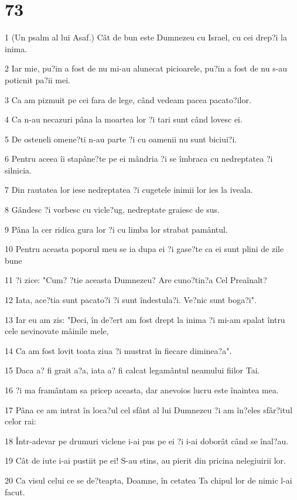 \chapter{73}

\par 1 (Un psalm al lui Asaf.) Cât de bun este Dumnezeu cu Israel, cu cei drep?i la inima.
\par 2 Iar mie, pu?in a fost de nu mi-au alunecat picioarele, pu?in a fost de nu s-au poticnit pa?ii mei.
\par 3 Ca am pizmuit pe cei fara de lege, când vedeam pacea pacato?ilor.
\par 4 Ca n-au necazuri pâna la moartea lor ?i tari sunt când lovesc ei.
\par 5 De osteneli omene?ti n-au parte ?i cu oamenii nu sunt biciui?i.
\par 6 Pentru aceea îi stapâne?te pe ei mândria ?i se îmbraca cu nedreptatea ?i silnicia.
\par 7 Din rautatea lor iese nedreptatea ?i cugetele inimii lor ies la iveala.
\par 8 Gândesc ?i vorbesc cu vicle?ug, nedreptate graiesc de sus.
\par 9 Pâna la cer ridica gura lor ?i cu limba lor strabat pamântul.
\par 10 Pentru aceasta poporul meu se ia dupa ei ?i gase?te ca ei sunt plini de zile bune
\par 11 ?i zice: "Cum? ?tie aceasta Dumnezeu? Are cuno?tin?a Cel Preaînalt?
\par 12 Iata, ace?tia sunt pacato?i ?i sunt îndestula?i. Ve?nic sunt boga?i".
\par 13 Iar eu am zis: "Deci, în de?ert am fost drept la inima ?i mi-am spalat întru cele nevinovate mâinile mele,
\par 14 Ca am fost lovit toata ziua ?i mustrat în fiecare diminea?a".
\par 15 Daca a? fi grait a?a, iata a? fi calcat legamântul neamului fiilor Tai.
\par 16 ?i ma framântam sa pricep aceasta, dar anevoios lucru este înaintea mea.
\par 17 Pâna ce am intrat în loca?ul cel sfânt al lui Dumnezeu ?i am în?eles sfâr?itul celor rai:
\par 18 Într-adevar pe drumuri viclene i-ai pus pe ei ?i i-ai doborât când se înal?au.
\par 19 Cât de iute i-ai pustiit pe ei! S-au stins, au pierit din pricina nelegiuirii lor.
\par 20 Ca visul celui ce se de?teapta, Doamne, în cetatea Ta chipul lor de nimic l-ai facut.
